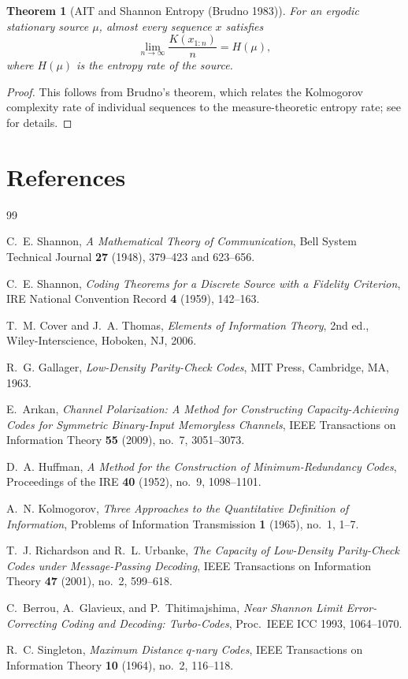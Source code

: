 \documentclass[12pt,a4paper]{amsart}
\newtheorem{theorem}{Theorem}[section]
\theoremstyle{definition}
\theoremstyle{remark}
\begin{document}
\begin{theorem}[AIT and Shannon Entropy (Brudno 1983)]
For an ergodic stationary source $\mu$, almost every sequence $x$ satisfies
\[
  \lim_{n\to\infty} \frac{K(x_{1:n})}{n} = H(\mu),
\]
where $H(\mu)$ is the entropy rate of the source.
\end{theorem}
\begin{proof}
This follows from Brudno's theorem, which relates the Kolmogorov complexity
rate of individual sequences to the measure-theoretic entropy rate; see
\cite{CoverThomas2006} for details.
\end{proof}

\section{References}

\begin{thebibliography}{99}

C.~E. Shannon,
\emph{A Mathematical Theory of Communication},
Bell System Technical Journal \textbf{27} (1948), 379--423 and 623--656.

C.~E. Shannon,
\emph{Coding Theorems for a Discrete Source with a Fidelity Criterion},
IRE National Convention Record \textbf{4} (1959), 142--163.

T.~M. Cover and J.~A. Thomas,
\emph{Elements of Information Theory}, 2nd ed.,
Wiley-Interscience, Hoboken, NJ, 2006.

R.~G. Gallager,
\emph{Low-Density Parity-Check Codes},
MIT Press, Cambridge, MA, 1963.

E.~Ar\i{}kan,
\emph{Channel Polarization: A Method for Constructing Capacity-Achieving Codes
for Symmetric Binary-Input Memoryless Channels},
IEEE Transactions on Information Theory \textbf{55} (2009), no.~7, 3051--3073.

D.~A. Huffman,
\emph{A Method for the Construction of Minimum-Redundancy Codes},
Proceedings of the IRE \textbf{40} (1952), no.~9, 1098--1101.

A.~N. Kolmogorov,
\emph{Three Approaches to the Quantitative Definition of Information},
Problems of Information Transmission \textbf{1} (1965), no.~1, 1--7.

T.~J. Richardson and R.~L. Urbanke,
\emph{The Capacity of Low-Density Parity-Check Codes under Message-Passing
Decoding},
IEEE Transactions on Information Theory \textbf{47} (2001), no.~2, 599--618.

C.~Berrou, A.~Glavieux, and P.~Thitimajshima,
\emph{Near Shannon Limit Error-Correcting Coding and Decoding: Turbo-Codes},
Proc.\ IEEE ICC 1993, 1064--1070.

R.~C. Singleton,
\emph{Maximum Distance $q$-nary Codes},
IEEE Transactions on Information Theory \textbf{10} (1964), no.~2, 116--118.

\end{thebibliography}
\end{document}
